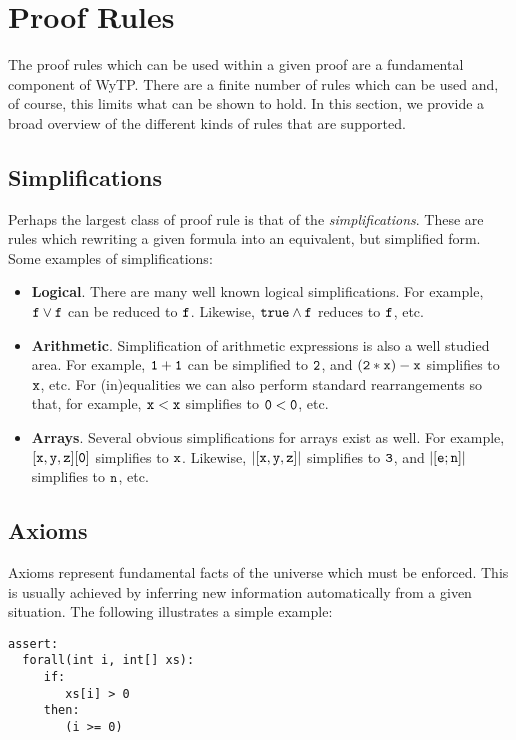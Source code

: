 \section{Proof Rules}

The proof rules which can be used within a given proof are a
fundamental component of WyTP.  There are a finite number of rules
which can be used and, of course, this limits what can be shown to
hold.  In this section, we provide a broad overview of the different
kinds of rules that are supported.

\subsection{Simplifications}

Perhaps the largest class of proof rule is that of the {\em
  simplifications}.  These are rules which rewriting a given formula
into an equivalent, but simplified form.  Some examples of
simplifications:

\begin{itemize}
\item {\bf Logical}.  There are many well known logical
  simplifications.  For example, ${\tt f\lor f}$ can be reduced to
  ${\tt f}$.  Likewise, ${\tt true\land f}$ reduces to ${\tt f}$, etc.
\item {\bf Arithmetic}.  Simplification of arithmetic expressions is
  also a well studied area.  For example, ${\tt 1+1}$ can be
  simplified to ${\tt 2}$, and ${\tt (2*x) - x}$ simplifies to
  ${\tt x}$, etc.  For (in)equalities we can also perform standard
  rearrangements so that, for example, ${\tt x < x}$ simplifies to
  ${\tt 0 < 0}$, etc.
\item {\bf Arrays}.  Several obvious simplifications for arrays exist
  as well.  For example, ${\tt [x,y,z][0]}$ simplifies to ${\tt x}$.
  Likewise, ${\tt |[x,y,z]|}$ simplifies to ${\tt 3}$, and
  ${\tt |[e;n]|}$ simplifies to ${\tt n}$, etc.
\end{itemize}

\subsection{Axioms}

Axioms represent fundamental facts of the universe which must be
enforced.  This is usually achieved by inferring new information
automatically from a given situation.  The following illustrates a
simple example:

\begin{lstlisting}[language=WyAL]
assert:
  forall(int i, int[] xs):
     if:
        xs[i] > 0
     then:
        (i >= 0)
\end{lstlisting}

